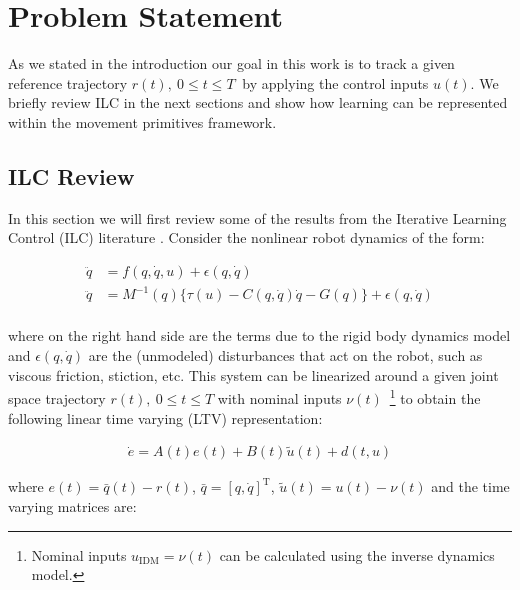 \documentclass[10pt,a4paper]{article}
\newcommand{\joint}{q} %
\newcommand{\state}{\bar{\joint}} %
\newcommand{\error}{e} %
\newcommand{\traj}{r} %
\newcommand{\dist}{\epsilon} %
\newcommand{\linDist}{d} %
\newcommand{\sysInput}{u} %
\newcommand{\linInput}{\tilde{u}} %
\newcommand{\trjInput}{\nu} %
\newcommand{\dynamics}{f}
\begin{document}
\section{Problem Statement}\label{problemStatement}

As we stated in the introduction our goal in this work is to track a given reference trajectory $\traj(t), \ 0 \leq t \leq T \ $ by applying the control inputs $\sysInput(t)$. We briefly review ILC in the next sections and show how learning can be represented within the movement primitives framework.

\subsection{ILC Review}\label{ilcReview}

In this section we will first review some of the results from the Iterative Learning Control (ILC) literature \cite{Bristow06}. Consider the nonlinear robot dynamics of the form:

\begin{equation}
\begin{aligned}
\ddot{\joint} &= \dynamics(\joint,\dot{\joint},\sysInput) + \dist(\joint,\dot{\joint})\\
\ddot{\joint} &= M^{-1}(\joint)\{ \tau(\sysInput) - C(\joint,\dot{\joint})\dot{\joint} - G(\joint)\} + \dist(\joint,\dot{\joint})\\
\end{aligned}
\label{dynamics}
\end{equation}

where on the right hand side are the terms due to the rigid body dynamics model and $\dist(\joint,\dot{\joint})$ are the (unmodeled) disturbances that act on the robot, such as viscous friction, stiction, etc. This system can be linearized around a given joint space trajectory $\traj(t), \ 0 \leq t \leq T$ with nominal inputs $\nu(t)$~\footnote{Nominal inputs $\sysInput_{\text{IDM}} = \nu(t)$ can be calculated using the inverse dynamics model.} to obtain the following linear time varying (LTV) representation:

\begin{equation}
\begin{aligned}
\dot{\error} = A(t)\error(t) + B(t)\linInput(t) + \linDist(t,\sysInput)
\end{aligned}
\label{LTV}
\end{equation}

where $\error(t) = \state(t) - \traj(t)$, $\state = [\joint,\dot{\joint}]^{\mathrm{T}}$, $\linInput(t) = \sysInput(t) - \trjInput(t)$ and the time varying matrices are:
\end{document}
